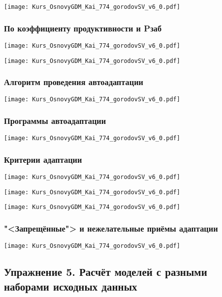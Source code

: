 \documentclass[main.tex]{subfiles}
\begin{document}
\texttt{[image: Kurs\_OsnovyGDM\_Kai\_774\_gorodovSV\_v6\_0.pdf]}

\subsubsection{По коэффициенту продуктивности и Pзаб}

\texttt{[image: Kurs\_OsnovyGDM\_Kai\_774\_gorodovSV\_v6\_0.pdf]}

\texttt{[image: Kurs\_OsnovyGDM\_Kai\_774\_gorodovSV\_v6\_0.pdf]}

\subsubsection{Алгоритм проведения автоадаптации}

\texttt{[image: Kurs\_OsnovyGDM\_Kai\_774\_gorodovSV\_v6\_0.pdf]}

\subsubsection{Программы автоадаптации}

\texttt{[image: Kurs\_OsnovyGDM\_Kai\_774\_gorodovSV\_v6\_0.pdf]}

\subsubsection{Критерии адаптации}

\texttt{[image: Kurs\_OsnovyGDM\_Kai\_774\_gorodovSV\_v6\_0.pdf]}

\texttt{[image: Kurs\_OsnovyGDM\_Kai\_774\_gorodovSV\_v6\_0.pdf]}

\texttt{[image: Kurs\_OsnovyGDM\_Kai\_774\_gorodovSV\_v6\_0.pdf]}

\subsubsection{"<Запрещённые"> и нежелательные приёмы адаптации}

\texttt{[image: Kurs\_OsnovyGDM\_Kai\_774\_gorodovSV\_v6\_0.pdf]}

\subsection{Упражнение 5. Расчёт моделей с разными наборами исходных данных}
\end{document}
